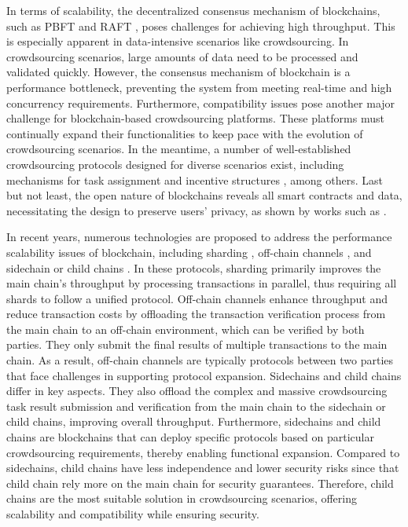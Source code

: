 \documentclass[10pt,journal]{IEEEtran}
\begin{document}
In terms of scalability, the decentralized consensus mechanism of blockchains, such as PBFT \cite{castro2002practical} and RAFT \cite{ongaro2014search}, poses challenges for achieving high throughput. This is especially apparent in data-intensive scenarios like crowdsourcing. In crowdsourcing scenarios, large amounts of data need to be processed and validated quickly. However, the consensus mechanism of blockchain is a performance bottleneck, preventing the system from meeting real-time and high concurrency requirements. Furthermore, compatibility issues pose another major challenge for blockchain-based crowdsourcing platforms. These platforms must continually expand their functionalities to keep pace with the evolution of crowdsourcing scenarios. In the meantime, a number of well-established crowdsourcing protocols designed for diverse scenarios exist, including mechanisms for task assignment \cite{zheng2015qasca, wang2017multi, bhatti2020approximation} and incentive structures \cite{zhang2014free, yang2015incentive, wang2020socialrecruiter}, among others. Last but not least, the open nature of blockchains reveals all smart contracts and data, necessitating the design to preserve users' privacy, as shown by works such as \cite{qiu2020location, yuan2019priradar,wang2019towards, zhang2021enabling, cai2019towards}.

In recent years, numerous technologies are proposed to address the performance scalability issues of blockchain, including sharding \cite{luu2016secure,li2024secure,li2025s3voting}, off-chain channels \cite{poon2016bitcoin,luo2024crosschannel}, and sidechain or child chains \cite{poon2017plasma}. In these protocols, sharding primarily improves the main chain's throughput by processing transactions in parallel, thus requiring all shards to follow a unified protocol. Off-chain channels enhance throughput and reduce transaction costs by offloading the transaction verification process from the main chain to an off-chain environment, which can be verified by both parties. They only submit the final results of multiple transactions to the main chain. As a result, off-chain channels are typically protocols between two parties that face challenges in supporting protocol expansion. Sidechains and child chains differ in key aspects. They also offload the complex and massive crowdsourcing task result submission and verification from the main chain to the sidechain or child chains, improving overall throughput. Furthermore, sidechains and child chains are blockchains that can deploy specific protocols based on particular crowdsourcing requirements, thereby enabling functional expansion. Compared to sidechains, child chains have less independence and lower security risks since that child chain rely more on the main chain for security guarantees. Therefore, child chains are the most suitable solution in crowdsourcing scenarios, offering scalability and compatibility while ensuring security.
\end{document}
